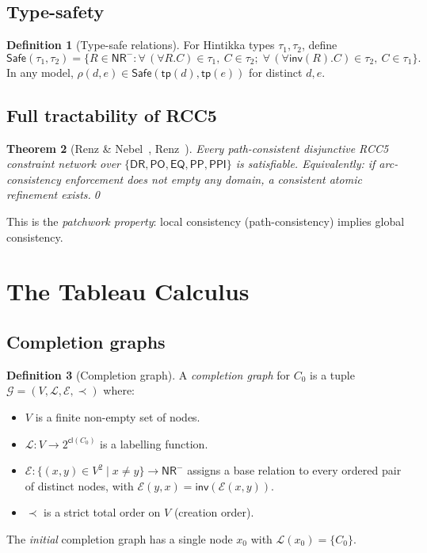 \documentclass[a4paper,11pt]{article}
\newtheorem{theorem}{Theorem}[section]
\theoremstyle{definition}
\newtheorem{definition}[theorem]{Definition}
\newcommand{\DR}{\ensuremath{\mathsf{DR}}}
\newcommand{\PO}{\ensuremath{\mathsf{PO}}}
\newcommand{\EQ}{\ensuremath{\mathsf{EQ}}}
\newcommand{\PP}{\ensuremath{\mathsf{PP}}}
\newcommand{\PPI}{\ensuremath{\mathsf{PPI}}}
\newcommand{\inv}{\ensuremath{\mathsf{inv}}}
\newcommand{\cl}{\ensuremath{\mathsf{cl}}}
\newcommand{\tp}{\ensuremath{\mathsf{tp}}}
\newcommand{\NR}{\ensuremath{\mathsf{NR}}}
\newcommand{\Safe}{\ensuremath{\mathsf{Safe}}}
\newcommand{\GG}{\ensuremath{\mathcal{G}}}
\newcommand{\LL}{\ensuremath{\mathcal{L}}}
\newcommand{\EE}{\ensuremath{\mathcal{E}}}
\begin{document}
\subsection{Type-safety}

\begin{definition}[Type-safe relations]\label{def:safe}
For Hintikka types $\tau_1, \tau_2$, define
\[
\Safe(\tau_1, \tau_2) = \bigl\{R \in \NR^{-} :
\forall\, (\forall R.C) \in \tau_1,\ C \in \tau_2;\;
\forall\, (\forall\inv(R).C) \in \tau_2,\ C \in \tau_1
\bigr\}.
\]
In any model, $\rho(d, e) \in \Safe(\tp(d), \tp(e))$ for
distinct $d, e$.
\end{definition}

\subsection{Full tractability of RCC5}

\begin{theorem}[Renz \& Nebel~\protect\cite{RenzNebel1999},
Renz~\protect\cite{Renz1999}]\label{thm:patchwork}
Every path-consistent disjunctive RCC5 constraint network
over $\{\DR, \PO, \EQ, \PP, \PPI\}$ is satisfiable.
Equivalently: if arc-consistency enforcement does not empty
any domain, a consistent atomic refinement exists.\qed
\end{theorem}

This is the \emph{patchwork property}: local consistency
(path-consistency) implies global consistency.


\section{The Tableau Calculus}\label{sec:tableau}

\subsection{Completion graphs}

\begin{definition}[Completion graph]\label{def:cg}
A \emph{completion graph} for $C_0$ is a tuple
$\GG = (V, \LL, \EE, \prec)$ where:
\begin{itemize}[nosep]
  \item $V$ is a finite non-empty set of nodes.
  \item $\LL: V \to 2^{\cl(C_0)}$ is a labelling function.
  \item $\EE: \{(x,y) \in V^2 \mid x \neq y\}
    \to \NR^{-}$ assigns a base relation to every ordered pair
    of distinct nodes, with $\EE(y,x) = \inv(\EE(x,y))$.
  \item $\prec$ is a strict total order on $V$ (creation order).
\end{itemize}
The \emph{initial} completion graph has a single node $x_0$
with $\LL(x_0) = \{C_0\}$.
\end{definition}
\end{document}
